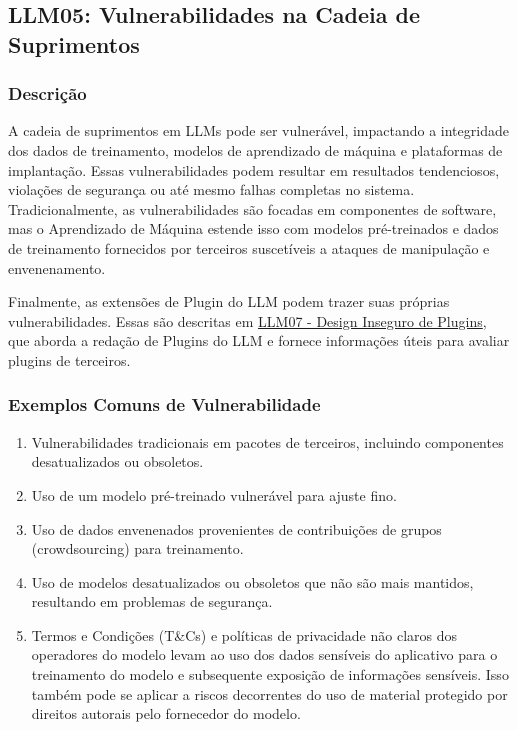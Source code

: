 \documentclass[
]{article}
\author{}
\date{}
\providecommand{\tightlist}{%
  \setlength{\itemsep}{0pt}\setlength{\parskip}{0pt}}
\begin{document}
\subsection{LLM05: Vulnerabilidades na Cadeia de
Suprimentos}\label{llm05-vulnerabilidades-na-cadeia-de-suprimentos}

\subsubsection{Descrição}\label{descriuxe7uxe3o}

A cadeia de suprimentos em LLMs pode ser vulnerável, impactando a
integridade dos dados de treinamento, modelos de aprendizado de máquina
e plataformas de implantação. Essas vulnerabilidades podem resultar em
resultados tendenciosos, violações de segurança ou até mesmo falhas
completas no sistema. Tradicionalmente, as vulnerabilidades são focadas
em componentes de software, mas o Aprendizado de Máquina estende isso
com modelos pré-treinados e dados de treinamento fornecidos por
terceiros suscetíveis a ataques de manipulação e envenenamento.

Finalmente, as extensões de Plugin do LLM podem trazer suas próprias
vulnerabilidades. Essas são descritas em
\href{InsecurePluginDesign.md}{LLM07 - Design Inseguro de Plugins}, que
aborda a redação de Plugins do LLM e fornece informações úteis para
avaliar plugins de terceiros.

\subsubsection{Exemplos Comuns de
Vulnerabilidade}\label{exemplos-comuns-de-vulnerabilidade}

\begin{enumerate}
\def\labelenumi{\arabic{enumi}.}
\tightlist
\item
  Vulnerabilidades tradicionais em pacotes de terceiros, incluindo
  componentes desatualizados ou obsoletos.
\item
  Uso de um modelo pré-treinado vulnerável para ajuste fino.
\item
  Uso de dados envenenados provenientes de contribuições de grupos
  (crowdsourcing) para treinamento.
\item
  Uso de modelos desatualizados ou obsoletos que não são mais mantidos,
  resultando em problemas de segurança.
\item
  Termos e Condições (T\&Cs) e políticas de privacidade não claros dos
  operadores do modelo levam ao uso dos dados sensíveis do aplicativo
  para o treinamento do modelo e subsequente exposição de informações
  sensíveis. Isso também pode se aplicar a riscos decorrentes do uso de
  material protegido por direitos autorais pelo fornecedor do modelo.
\end{enumerate}
\end{document}
